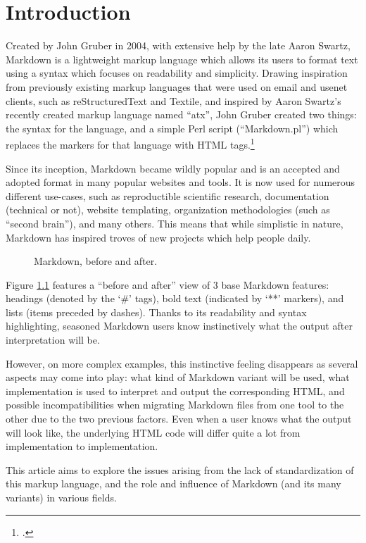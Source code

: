 \chapter{Introduction}
\label{chap:introduction}

\vspace{1cm}

Created by John Gruber in 2004, with extensive help by the late Aaron Swartz, Markdown is a lightweight markup language which allows its
users to format text using a syntax which focuses on readability and simplicity.
Drawing inspiration from previously existing markup languages that were used on email and usenet clients, such as reStructuredText and Textile,
and inspired by Aaron Swartz's recently created markup language named ``atx'', John Gruber created two things: the syntax for the language, and a simple
Perl script (``Markdown.pl'') which replaces the markers for that language with HTML tags.\footcite{gruber2004markdown}\newline

Since its inception, Markdown became wildly popular and is an accepted and adopted format in many popular websites and tools. It is now used for
numerous different use-cases, such as reproductible scientific research, documentation (technical or not), website templating, organization
methodologies (such as ``second brain''), and many others. This means that while simplistic in nature, Markdown has inspired troves of
new projects which help people daily.\newline

\begin{figure}[H]
    \hspace{-3cm}
    \qquad
    \caption{Markdown, before and after.}
    \label{fig:example-simple-syntax}
\end{figure}

Figure \ref{fig:example-simple-syntax} features a ``before and after'' view of 3 base Markdown features: headings (denoted by the `\#' tags),
bold text (indicated by `**' markers), and lists (items preceded by dashes). Thanks to its readability and syntax highlighting, seasoned
Markdown users know instinctively what the output after interpretation will be.\newline

However, on more complex examples, this instinctive feeling disappears as several aspects may come into play: what kind of Markdown variant will
be used, what implementation is used to interpret and output the corresponding HTML, and possible incompatibilities when migrating Markdown files
from one tool to the other due to the two previous factors. Even when a user knows what the output will look like, the underlying HTML code
will differ quite a lot from implementation to implementation.\newline

This article aims to explore the issues arising from the lack of standardization of this markup language, and the role and influence of
Markdown (and its many variants) in various fields.